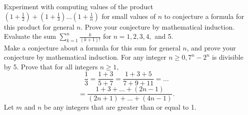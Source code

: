 \documentclass[12pt,letterpaper, onecolumn]{exam}
\begin{document}
		\begin{questions}
		 \setcounter{question}{1}\question Experiment with computing values of the product $(1+\frac{1}{2})+(1+\frac{1}{3})...(1+\frac{1}{n})$ for small values of $n$ to conjecture a formula for this product for general $n$. Prove your conjecture by mathematical induction.
		 \setcounter{question}{4}\question Evaluate the sum $\sum_{k=1}^{n}\frac{k}{(k+1)!}$ for $n=1,2,3,4,$ and 5.\\
		 Make a conjecture about a formula for this sum for general $n$, and prove your conjecture by mathematical induction.
		 \setcounter{question}{11}\question For any integer $n\geq0, 7^n-2^n$ is divisible by 5.
		 \setcounter{question}{27}\question Prove that for all integers $n\geq1,$
		 $$\frac{1}{3}=\frac{1+3}{5+7}=\frac{1+3+5}{7+9+11}=...$$
		 $$=\frac{1+3+...+(2n-1)}{(2n+1)+...+(4n-1)}.$$
		 \setcounter{question}{34}\question Let $m$ and $n$ be any integers that are greater than or equal to 1.
		\end{questions}
\end{document}
